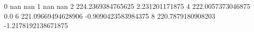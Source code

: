 0 nan nan
1 nan nan
2 224.2369384765625 2.231201171875
4 222.0057373046875 0.0
6 221.09669494628906 -0.9090423583984375
8 220.7879180908203 -1.2178192138671875
